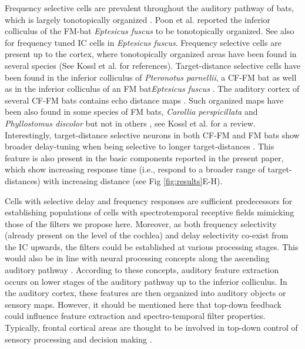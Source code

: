 \documentclass[10pt,letterpaper]{article}
\begin{document}
Frequency selective cells are prevalent throughout the auditory pathway of bats, which is largely tonotopically organized \cite{Pollak1989}. Poon et al. \cite{Poon1990} reported the inferior colliculus of the FM-bat \textit{Eptesicus fuscus} to be tonotopically organized. See also\cite{Ferragamo1997,Macias2018} for frequency tuned IC cells in \textit{Eptesicus fuscus}. Frequency selective cells are present up to the cortex, where tonotopically organized areas have been found in several species (See Kossl et al. \cite{Kossl2015} for references). Target-distance selective cells have been found in the inferior colliculus of \textit{Pteronotus parnellii}, a CF-FM bat \cite{Wenstrup2011} as well as in the inferior colliculus of an FM bat\textit{Eptesicus fuscus} \cite{Macias2018}. The auditory cortex of several CF-FM bats contains echo distance maps \cite{Kossl2015}. Such organized maps have been also found in some species of FM bats, \textit{Carollia perspicillata} and \textit{Phyllostomus discolor} \cite{Hagemann2010,Greiter2017} but not in others \cite{Dear1993,Dear1993a,Wong1988}, see  Kossl et al. \cite{Kossl2014} for a review. Interestingly, target-distance selective neurons in both CF-FM and FM bats show broader delay-tuning when being selective to longer target-distances \cite{Hechavarria2013}. This feature is also present in the basic components reported in the present paper, which show increasing response time (i.e., respond to a broader range of target-distances) with increasing distance (see Fig \ref{fig:results}E-H). 

Cells with selective delay and frequency responses are sufficient predecessors for establishing populations of cells with spectrotemporal receptive fields mimicking those of the filters we propose here. Moreover, as both frequency selectivity (already present on the level of the cochlea) and delay selectivity co-exist from the IC upwards, the filters could be established at various processing stages. This would also be in line with neural processing concepts along the ascending auditory pathway \cite{Nelken2004}. According to these concepts, auditory feature extraction occurs on lower stages of the auditory pathway up to the inferior colliculus. In the auditory cortex, these features are then organized into auditory objects or sensory maps. However, it should be mentioned here that top-down feedback could influence feature extraction and spectro-temporal filter properties. Typically, frontal cortical areas are thought to be involved in top-down control of sensory processing \cite{Duncan2001,Miller2001b,Everling2006,Fritz2010} and decision making \cite{Gold2007}.
\end{document}
